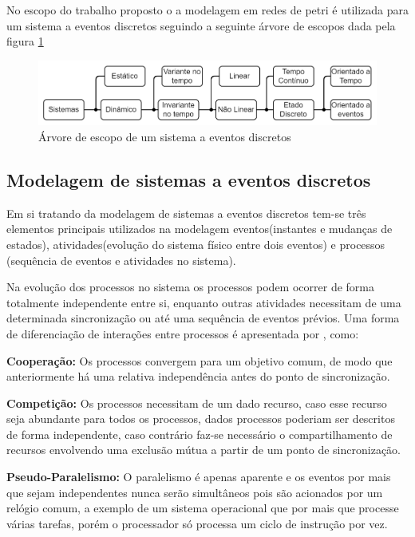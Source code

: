 No escopo do trabalho proposto o a modelagem em redes de petri é utilizada para um sistema a eventos discretos seguindo a seguinte árvore de escopos dada pela figura \ref{fig:arvore_escopo}
\begin{figure}
    \centering
    \includegraphics[scale=0.4]{figures/Petri/arvore_escopo.png}
    \caption{Árvore de escopo de um sistema a eventos discretos }
    \label{fig:arvore_escopo}
\end{figure}

    
\subsection{Modelagem de sistemas a eventos discretos}

Em si tratando da modelagem de sistemas a eventos discretos tem-se três elementos principais utilizados na modelagem eventos(instantes e mudanças de estados), atividades(evolução do sistema físico entre dois eventos) e processos (sequência de eventos e atividades no sistema). 

Na evolução dos processos no sistema os processos podem ocorrer de forma totalmente independente entre si, enquanto outras atividades necessitam de uma determinada sincronização ou até uma sequência de eventos prévios. Uma forma de diferenciação de interações entre processos é apresentada por \cite{vallete}, como:

\textbf{Cooperação:} Os processos convergem para um objetivo comum, de modo que anteriormente há uma relativa independência antes do ponto de sincronização.

\textbf{Competição:} Os processos necessitam de um dado recurso, caso esse recurso seja abundante para todos os processos, dados processos poderiam ser descritos de forma independente, caso contrário faz-se necessário o compartilhamento de recursos envolvendo uma exclusão mútua a partir de um ponto de sincronização.

\textbf{Pseudo-Paralelismo:} O paralelismo é apenas aparente e os eventos por mais que sejam independentes nunca serão simultâneos pois são acionados por um relógio comum, a exemplo de um sistema operacional que por mais que processe várias tarefas, porém o processador só processa um ciclo de instrução por vez.

